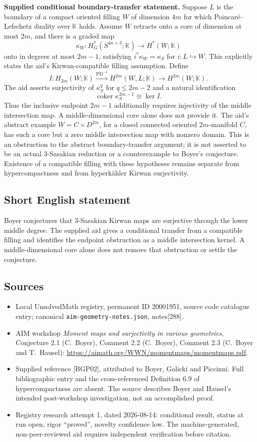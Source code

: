\documentclass[11pt]{article}
\begin{document}
\textbf{Supplied conditional boundary-transfer statement.} Suppose $L$ is the boundary of a compact oriented filling $W$ of dimension $4m$ for which Poincar\'e--Lefschetz duality over $\mathbb K$ holds. Assume $W$ retracts onto a core of dimension at most $2m$, and there is a graded map
\[
 \kappa_W:H_G^*(S^{4n+3};\mathbb K)\longrightarrow H^*(W;\mathbb K)
\]
onto in degrees at most $2m-1$, satisfying $i^*\kappa_W=\kappa_S$ for $i:L\hookrightarrow W$. This explicitly states the aid's Kirwan-compatible filling assumption. Define
\[
 I:H_{2m}(W;\mathbb K)\xrightarrow{\mathrm{PD}^{-1}}
       H^{2m}(W,L;\mathbb K)\longrightarrow H^{2m}(W;\mathbb K).
\]
The aid asserts surjectivity of $\kappa_S^q$ for $q\le2m-2$ and a natural identification
\[
 \operatorname{coker}\kappa_S^{2m-1}\cong\ker I.
\]
Thus the inclusive endpoint $2m-1$ additionally requires injectivity of the middle intersection map. A middle-dimensional core alone does not provide it. The aid's abstract example $W=C\times D^{2m}$, for a closed connected oriented $2m$-manifold $C$, has such a core but a zero middle intersection map with nonzero domain. This is an obstruction to the abstract boundary-transfer argument; it is not asserted to be an actual 3-Sasakian reduction or a counterexample to Boyer's conjecture. Existence of a compatible filling with these hypotheses remains separate from hypercompactness and from hyperk\"ahler Kirwan surjectivity.
\subsection{Short English statement}
Boyer conjectures that 3-Sasakian Kirwan maps are surjective through the lower middle degree. The supplied aid gives a conditional transfer from a compatible filling and identifies the endpoint obstruction as a middle intersection kernel. A middle-dimensional core alone does not remove that obstruction or settle the conjecture.
\subsection{Sources}
\begin{itemize}
\item Local UnsolvedMath registry, permanent ID 20001951, source code catalogue entry; canonical \texttt{aim-geometry-notes.json}, notes[288].
\item AIM workshop \emph{Moment maps and surjectivity in various geometries}, Conjecture 2.1 (C.~Boyer), Comment 2.2 (C.~Boyer), Comment 2.3 (C.~Boyer and T.~Hausel): \url{https://aimath.org/WWN/momentmaps/momentmaps.pdf}.
\item Supplied reference [BGP02], attributed to Boyer, Galicki and Piccinni. Full bibliographic entry and the cross-referenced Definition 6.9 of hypercompactness are absent. The source describes Boyer and Hausel's intended post-workshop investigation, not an accomplished proof.
\item Registry research attempt 1, dated 2026-08-14: conditional result, status at run open, rigor ``proved'', novelty confidence low. The machine-generated, non-peer-reviewed aid requires independent verification before citation.
\end{itemize}
\end{document}
